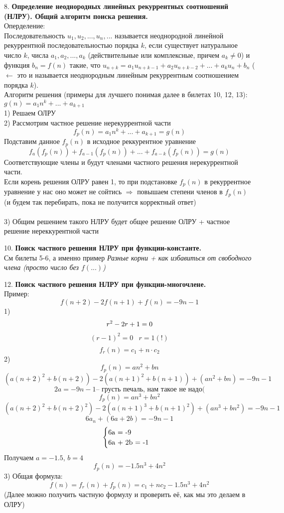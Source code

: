 \documentclass[12pt]{article}
\begin{document}
8. \textbf{Определение неоднородных линейных рекуррентных соотношений (НЛРУ). Общий алгоритм поиска решения.}\\
Оперделение:\\
Последовательность $u_1, u_2, ..., u_n, ...$ называется неоднородной линейной рекуррентной последовательностью порядка $k$, если существует натуральное число $k$, числа $a_1, a_2, ..., a_k$ (действительные или комплексные, причем $a_k \neq 0$) и функция $b_n = f(n)$ такие, что  $u_{n+k} = a_1u_{n+k-1} + a_2u_{n+k-2} + ... + a_ku_n + b_n$ ($\leftarrow$ это и называется неоднородным линейным рекуррентным соотношением порядка $k$).\\
Алгоритм решения (примеры для лучшего понимая далее в билетах 10, 12, 13):\\
$g(n) = a_1n^k + ... + a_{k+1}$\\
1) Решаем ОЛРУ\\
2) Рассмотрим частное решение нерекуррентной части
\[
    f_p(n) = a_1n^k + ... + a_{k+1} = g(n)
\]
Подставим данное $f_p(n)$ в исходное реккурентное уравнение
\[
    f_a(f_p(n)) + f_{a-1}(f_p(n)) + ... + f_{a-k}(f_p(n)) = g(n)
\]
Соответствующие члены и будут членами частного решения нерекуррентной части.\\
Если корень решения ОЛРУ равен 1, то при подстановке $f_p(n)$ в рекуррентное уравнение у нас оно может не сойтись $\Rightarrow$ повышаем степени членов в $f_p(n)$ (и будем так перебирать, пока не получится корректный ответ)\\\\
3) Общим решением такого НЛРУ будет общее решение ОЛРУ + частное решение нереккурентной части

10. \textbf{Поиск частного решения НЛРУ при функции-константе.}\\
См билеты 5-6, а именно пример \textit{Разные корни + как избавиться от свободного члена (просто число без $f(...)$)}

12. \textbf{Поиск частного решения НЛРУ при функции-многочлене.}\\
Пример:\\
\[
f(n+2) - 2f(n+1)  + f(n) = -9n - 1
\]
1) 
\[
r^2 - 2r + 1 = 0\\
\]
\[
\begin{array}{cc}
    (r - 1)^2 = 0 & r = 1 (!)\\
\end{array}
\]
\[
f_r(n) = c_1 + n \cdot c_2
\]
2) 
\[
f_p(n) = an^2+ bn
\]
\[
(a(n+2)^2 + b(n+2)) - 2(a(n+1)^2 + b(n+1)) + (an^2 + bn) = -9n - 1
\]
\[
    2a = -9n - 1 \text{-- грусть печаль, нам такое не надо(}
\]
\[
f_p(n) = an^3+ bn^2
\]
\[
(a(n+2)^2 + b(n+2)^2) - 2(a(n+1)^3 + b(n+1)^2) + (an^3 + bn^2) = -9n - 1
\]
\[
6a_n + (6a + 2b) = -9n - 1
\]
\begin{equation*}
 \begin{cases}
   $6a = -9$
   \\
   $6a + 2b = -1$
 \end{cases}
\end{equation*}
Получаем $a = -1.5$, $b = 4$\\
\[f_p(n) = -1.5n^3 + 4n^2\]
3) Общая формула:
\[f(n) = f_r(n) + f_p(n) = c_1 + nc_2 - 1.5n^3 + 4n^2\]
(Далее можно получить частную формулу и проверить её, как мы это делаем в ОЛРУ)
\end{document}
